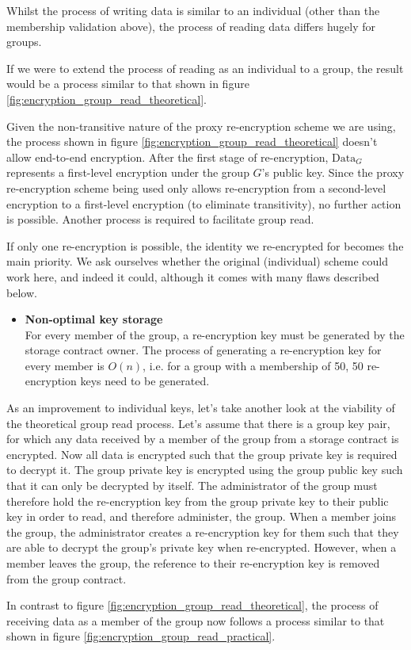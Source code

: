 Whilst the process of writing data is similar to an individual (other than the membership validation above), the process of reading data differs hugely for groups.

If we were to extend the process of reading as an individual to a group, the result would be a process similar to that shown in figure \ref{fig:encryption_group_read_theoretical}.



Given the non-transitive nature of the proxy re-encryption scheme we are using, the process shown in figure \ref{fig:encryption_group_read_theoretical} doesn't allow end-to-end encryption. After the first stage of re-encryption, $\text{Data}_{G}$ represents a first-level encryption under the group $G$'s public key. Since the proxy re-encryption scheme being used only allows re-encryption from a second-level encryption to a first-level encryption (to eliminate transitivity), no further action is possible. Another process is required to facilitate group read.

If only one re-encryption is possible, the identity we re-encrypted for becomes the main priority. We ask ourselves whether the original (individual) scheme could work here, and indeed it could, although it comes with many flaws described below.

\begin{itemize}
  \item 
  	\textbf{Non-optimal key storage} \\
    For every member of the group, a re-encryption key must be generated by the storage contract owner. The process of generating a re-encryption key for every member is $O(n)$, i.e. for a group with a membership of 50, 50 re-encryption keys need to be generated.
\end{itemize}

As an improvement to individual keys, let's take another look at the viability of the theoretical group read process. Let's assume that there is a group key pair, for which any data received by a member of the group from a storage contract is encrypted. Now all data is encrypted such that the group private key is required to decrypt it. The group private key is encrypted using the group public key such that it can only be decrypted by itself. The administrator of the group must therefore hold the re-encryption key from the group private key to their public key in order to read, and therefore administer, the group. When a member joins the group, the administrator creates a re-encryption key for them such that they are able to decrypt the group's private key when re-encrypted. However, when a member leaves the group, the reference to their re-encryption key is removed from the group contract.

In contrast to figure \ref{fig:encryption_group_read_theoretical}, the process of receiving data as a member of the group now follows a process similar to that shown in figure \ref{fig:encryption_group_read_practical}.




